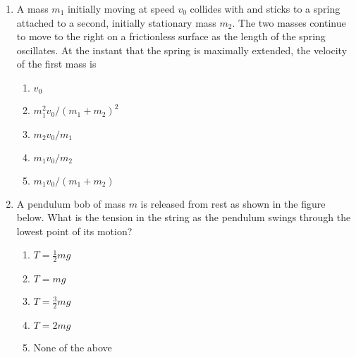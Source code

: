 \documentclass{../../oss-apphys}
\begin{document}
\begin{multicols}{2}
\begin{enumerate}[resume,leftmargin=18pt]
  \item A mass $m_1$ initially moving at speed $v_0$ collides with and sticks
    to a spring attached to a second, initially stationary mass $m_2$. The two
    masses continue to move to the right on a frictionless surface as the
    length of the spring oscillates. At the instant that the spring is
    maximally extended, the velocity of the first mass is
    \begin{center}
    \end{center}
    \begin{enumerate}[noitemsep,topsep=0pt,leftmargin=18pt,label=(\Alph*)]
    \item $v_0$
    \item $m_1^2v_0/(m_1+m_2)^2$
    \item $m_2v_0/m_1$
    \item $m_1v_0/m_2$
    \item $m_1v_0/(m_1+m_2)$
    \end{enumerate}
    \columnbreak
    
  \item A pendulum bob of mass $m$ is released from rest as shown in the figure
    below. What is the tension in the string as the pendulum swings through the
    lowest point of its motion?
    \begin{center}
    \end{center}
    \begin{enumerate}[noitemsep,topsep=0pt,leftmargin=18pt,label=(\Alph*)]
    \item $\displaystyle T=\frac{1}{2}mg$
    \item $T=mg$
    \item $\displaystyle T=\frac{3}{2}mg$
    \item $T=2mg$
    \item None of the above
    \end{enumerate}


\end{enumerate}
\end{multicols}
\end{document}
